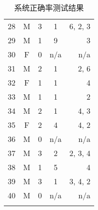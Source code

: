 \begin{center}
\begin{longtable}{ l c c c r }
    28 & M & 3 & 1 & 6, 2, 3 \\
    29 & M & 1 & 9 & 3 \\
    30 & F & 0 & n/a & n/a \\
    31 & M & 2 & 1 & 2, 6 \\
    32 & F & 1 & 1 & 4 \\
    33 & M & 1 & 1 & 2 \\
    34 & M & 2 & 1 & 4, 3 \\
    35 & F & 2 & 4 & 4, 2 \\
    36 & M & 0 & n/a & n/a \\
    37 & M & 3 & 2 & 2, 3, 4 \\
    38 & M & 1 & 5 & 4 \\
    39 & M & 3 & 1 & 3, 4, 2 \\
    40 & M & 0 & n/a & n/a \\
    \hline
  \caption{系统正确率测试结果} \\
  \end{longtable}

  \label{tab:sys-retrieval-correct-rate}
\end{center}

